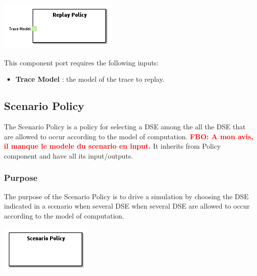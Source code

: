 \documentclass{gemoc} %
\begin{document}
\begin{center}
\includegraphics*[trim=0.0cm 0.0cm 0cm 0.0cm, clip=true]{../images/generated/Generated_Replay_Policy.png}
\end{center}

This component port requires the following inputs:
\begin{itemize}
  \item \textbf{Trace Model} :
the model of the trace to replay.
\end{itemize}



\subsection{Scenario Policy}
The Scenario Policy is a policy for selecting a DSE among the all the DSE that are allowed to occur according to the model of computation.
\textcolor{red}{\textbf{FBO: A mon avis, il manque le modele du scenario en input.}}
It inherits from Policy component and have all its input/outputs.

\subsubsection{Purpose}
The purpose of the Scenario Policy is to drive a simulation by choosing the DSE indicated in a scenario when several DSE when several DSE are allowed to occur according to the model of computation.

\begin{center}
\includegraphics*[trim=0.0cm 0.0cm 0cm 0.0cm, clip=true]{../images/generated/Generated_Scenario_Policy.png}
\end{center}
\end{document}
